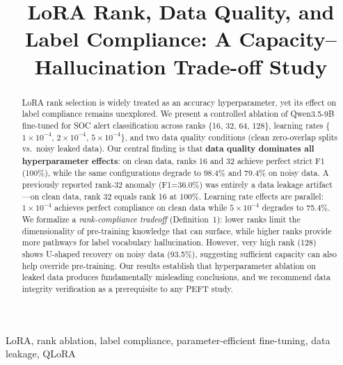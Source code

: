 \documentclass[journal]{IEEEtran}
\begin{document}
\title{LoRA Rank, Data Quality, and Label Compliance: A Capacity--Hallucination Trade-off Study}

\author{
}

\maketitle

\begin{abstract}
LoRA rank selection is widely treated as an accuracy hyperparameter, yet its effect on label compliance remains unexplored. We present a controlled ablation of Qwen3.5-9B fine-tuned for SOC alert classification across ranks \{16, 32, 64, 128\}, learning rates \{$1\times10^{-4}$, $2\times10^{-4}$, $5\times10^{-4}$\}, and two data quality conditions (clean zero-overlap splits vs.\ noisy leaked data). Our central finding is that \textbf{data quality dominates all hyperparameter effects}: on clean data, ranks 16 and 32 achieve perfect strict F1 (100\%), while the same configurations degrade to 98.4\% and 79.4\% on noisy data. A previously reported rank-32 anomaly (F1=36.0\%) was entirely a data leakage artifact---on clean data, rank 32 equals rank 16 at 100\%. Learning rate effects are parallel: $1\times10^{-4}$ achieves perfect compliance on clean data while $5\times10^{-4}$ degrades to 75.4\%. We formalize a \emph{rank-compliance tradeoff} (Definition~1): lower ranks limit the dimensionality of pre-training knowledge that can surface, while higher ranks provide more pathways for label vocabulary hallucination. However, very high rank (128) shows U-shaped recovery on noisy data (93.5\%), suggesting sufficient capacity can also help override pre-training. Our results establish that hyperparameter ablation on leaked data produces fundamentally misleading conclusions, and we recommend data integrity verification as a prerequisite to any PEFT study.
\end{abstract}

\begin{IEEEkeywords}
LoRA, rank ablation, label compliance, parameter-efficient fine-tuning, data leakage, QLoRA
\end{IEEEkeywords}
\end{document}
